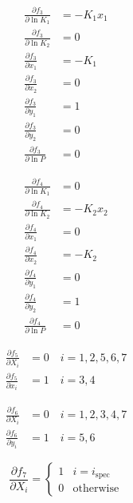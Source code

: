\documentclass[english]{../thermomemo/thermomemo}
\newcommand*{\pd}[2]{\ensuremath{\frac{\partial #1}{\partial{#2}}}}
\newcommand{\spec}{\text{spec}}
\begin{document}
\begin{align}
 \pd{f_3}{\ln K_1}  & = -K_1 x_1 \\
 \pd{f_3}{\ln K_2}  & = 0 \\
 \pd{f_3}{x_1}  & =  - K_1 \\
 \pd{f_3}{x_2}  & = 0 \\
 \pd{f_3}{y_1}  & = 1 \\
 \pd{f_3}{y_2}  & = 0 \\
 \pd{f_3}{\ln P}  & = 0
\end{align}

\begin{align}
 \pd{f_4}{\ln K_1}  & = 0 \\
 \pd{f_4}{\ln K_2}  & = -K_2 x_2 \\
 \pd{f_4}{x_1}  & = 0\\
 \pd{f_4}{x_2}  & = - K_2 \\
 \pd{f_4}{y_1}  & = 0 \\
 \pd{f_4}{y_2}  & = 1 \\
 \pd{f_4}{\ln P}  & = 0
\end{align}

\begin{align}
 \pd{f_5}{X_i}  & = 0 \quad i=1,2,5,6,7\\
 \pd{f_5}{x_i}  & = 1 \quad i=3,4
\end{align}

\begin{align}
 \pd{f_6}{X_i}  & = 0 \quad i=1,2,3,4,7\\
 \pd{f_6}{y_i}  & = 1 \quad i=5,6
\end{align}

\begin{equation}
 \pd{f_7}{X_i} =\begin{cases} 1 & i=i_{\spec}\\
   0 & \text{otherwise}
\end{cases}
\end{equation}
\end{document}
